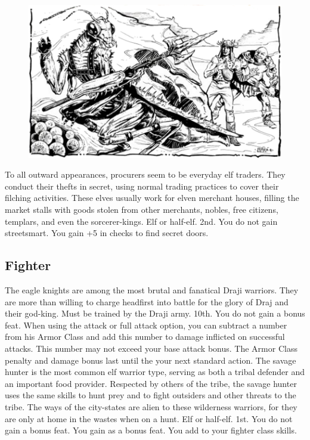 \begin{figure}[t!]
\centering
\includegraphics[width=\textwidth]{images/thrikreen-1.png}
\WOTC
\end{figure}
{To all outward appearances, procurers seem to be everyday elf traders. They conduct their thefts in secret, using normal trading practices to cover their filching activities. These elves usually work for elven merchant houses, filling the market stalls with goods stolen from other merchants, nobles, free citizens, templars, and even the sorcerer-kings.}
{Elf or half-elf.}
{2nd.}
{You do not gain streetsmart.}
{
	You gain +5 in  checks to find secret doors.
}

\vskip1cm
\subsection{Fighter}
{The eagle knights are among the most brutal and fanatical Draji warriors. They are more than willing to charge headfirst into battle for the glory of Draj and their god-king.}
{Must be trained by the Draji army.}
{10th.}
{You do not gain a bonus feat.}
{
	When using the attack or full attack option, you can subtract a number from his Armor Class and add this number to damage inflicted on successful attacks. This number may not exceed your base attack bonus. The Armor Class penalty and damage bonus last until the your next standard action.
}
{The savage hunter is the most common elf warrior type, serving as both a tribal defender and an important food provider. Respected by others of the tribe, the savage hunter uses the same skills to hunt prey and to fight outsiders and other threats to the tribe. The ways of the city-states are alien to these wilderness warriors, for they are only at home in the wastes when on a hunt.}
{Elf or half-elf.}
{1st.}
{You do not gain a bonus feat.}
{
	You gain  as a bonus feat. You add  to your fighter class skills.
}

